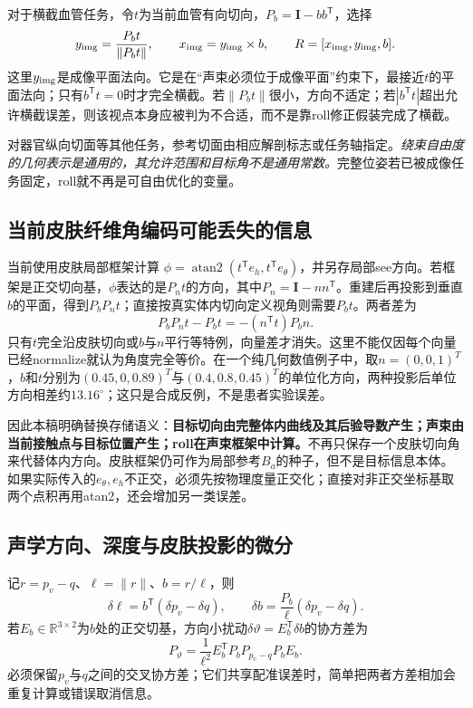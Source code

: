 \documentclass[UTF8,11pt,a4paper,fontset=fandol]{ctexart}
\numberwithin{equation}{section}
\theoremstyle{plain}
\theoremstyle{definition}
\theoremstyle{remark}
\newcommand{\R}{\mathbb R}\newcommand{\E}{\mathbb E}
\newcommand{\Id}{\mathbf I}\newcommand{\T}{^{\mathsf T}}
\begin{document}
对于横截血管任务，令$t$为当前血管有向切向，$P_b=\Id-bb\T$，选择
\begin{equation}
 y_{\rm img}=\frac{P_bt}{\|P_bt\|},\qquad
 x_{\rm img}=y_{\rm img}\times b,\qquad
 R=[x_{\rm img},y_{\rm img},b].
 \label{eq:transverse-frame}
\end{equation}
这里$y_{\rm img}$是成像平面法向。它是在“声束必须位于成像平面”约束下，最接近$t$的平面法向；只有$b\T t=0$时才完全横截。若$\|P_bt\|$很小，方向不适定；若$|b\T t|$超出允许横截误差，则该视点本身应被判为不合适，而不是靠roll修正假装完成了横截。

对器官纵向切面等其他任务，参考切面由相应解剖标志或任务轴指定。\emph{绕束自由度的几何表示是通用的，其允许范围和目标角不是通用常数。}完整位姿若已被成像任务固定，roll就不再是可自由优化的变量。

\subsection{当前皮肤纤维角编码可能丢失的信息}
当前使用皮肤局部框架计算
$\phi=\operatorname{atan2}(t\T e_h,t\T e_\theta)$，并另存局部see方向\cite{AmongCode}。若框架是正交切向基，$\phi$表达的是$P_nt$的方向，其中$P_n=\Id-nn\T$。重建后再投影到垂直$b$的平面，得到$P_bP_nt$；直接按真实体内切向定义视角则需要$P_bt$。两者差为
\begin{equation}
 \boxed{P_bP_nt-P_bt=-(n\T t)P_bn.}
 \label{eq:double-projection-error}
\end{equation}
只有$t$完全沿皮肤切向或$b$与$n$平行等特例，向量差才消失。这里不能仅因每个向量已经normalize就认为角度完全等价。在一个纯几何数值例子中，取$n=(0,0,1)^T$，$b$和$t$分别为$(0.45,0,0.89)^T$与$(0.4,0.8,0.45)^T$的单位化方向，两种投影后单位方向相差约$13.16^\circ$；这只是合成反例，不是患者实验误差。

因此本稿明确替换存储语义：\textbf{目标切向由完整体内曲线及其后验导数产生；声束由当前接触点与目标位置产生；roll在声束框架中计算。}不再只保存一个皮肤切向角来代替体内方向。皮肤框架仍可作为局部参考$B_a$的种子，但不是目标信息本体。如果实际传入的$e_\theta,e_h$不正交，必须先按物理度量正交化；直接对非正交坐标基取两个点积再用atan2，还会增加另一类误差。

\subsection{声学方向、深度与皮肤投影的微分}
记$r=p_v-q$、$\ell=\|r\|$、$b=r/\ell$，则
\begin{equation}
 \delta\ell=b\T(\delta p_v-\delta q),\qquad
 \delta b=\frac{P_b}{\ell}(\delta p_v-\delta q).
 \label{eq:beam-differential}
\end{equation}
若$E_b\in\R^{3\times2}$为$b$处的正交切基，方向小扰动$\delta\vartheta=E_b\T\delta b$的协方差为
\begin{equation}
 P_\vartheta=\frac{1}{\ell^2}E_b\T P_b
 P_{p_v-q}P_b E_b.
 \label{eq:angle-cov}
\end{equation}
必须保留$p_v$与$q$之间的交叉协方差；它们共享配准误差时，简单把两者方差相加会重复计算或错误取消信息。
\end{document}
